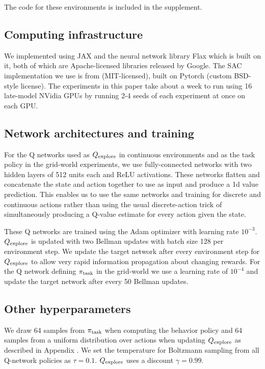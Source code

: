 \begin{subappendices}
The code for these environments is included in the supplement.



 \label{sec:appendix_benchmark_implementation}

\subsection{Computing infrastructure}
We implemented \algshort{} using JAX \citep{jax2018github} and the neural network library Flax \citep{flax2020github} which is built on it, both of which are Apache-licensed libraries released by Google.
The SAC implementation we use is from \citet{pytorch_sac} (MIT-licensed), built on Pytorch \citep{Paszke2019PyTorchAI} (custom BSD-style license).
The experiments in this paper take about a week to run using 16 late-model NVidia GPUs by running 2-4 seeds of each experiment at once on each GPU.

\subsection{Network architectures and training}
For the Q networks used as $Q_{\text{explore}}$ in continuous environments and as the task policy in the grid-world experiments, we use fully-connected networks with two hidden layers of 512 units each and ReLU activations.
These networks flatten and concatenate the state and action together to use as input and produce a 1d value prediction.
This enables us to use the same networks and training for discrete and continuous actions rather than using the usual discrete-action trick of simultaneously producing a Q-value estimate for every action given the state.

These Q networks are trained using the Adam optimizer \citep{kingma2014adam} with learning rate $10^{-3}$.
$Q_{\text{explore}}$ is updated with two Bellman updates with batch size 128 per environment step.
We update the target network after every environment step for $Q_{\text{explore}}$ to allow very rapid information propagation about changing rewards.
For the Q network defining $\pi_{\text{task}}$ in the grid-world we use a learning rate of $10^{-4}$ and update the target network after every 50 Bellman updates.

\subsection{Other hyperparameters}
We draw 64 samples from $\pi_{\text{task}}$ when computing the behavior policy and 64 samples from a uniform distribution over actions when updating $Q_{\text{explore}}$ as described in Appendix .
We set the temperature for Boltzmann sampling from all Q-network policies as $\tau = 0.1$.
$Q_{\text{explore}}$ uses a discount $\gamma = 0.99$.



\end{subappendices}
